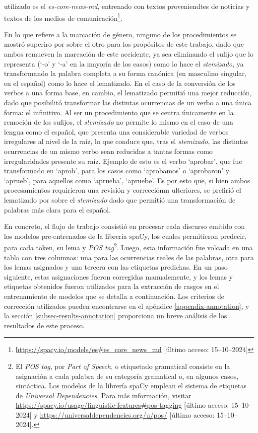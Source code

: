 utilizado es el \textit{es-core-news-md}, entrenado con textos
proveniendtes de noticias y textos de los medios de
comunicación\footnote{\url{https://spacy.io/models/es\#es_core_news_md}
[último acceso: 15--10--2024]}.
\par
En lo que refiere a la marcación de género, ninguno de los procedimientos se mostró
superiro por sobre el otro para los propósitos de este trabajo, dado que ambos
remueven la marcación de este accidente, ya sea eliminando el sufijo que lo
representa (`-o' y `-a' en la mayoría de los casos) como lo hace el
\textit{stemizado}, ya transformando la palabra completa a su forma canónica
(en masculino singular, en el español) como lo hace el lematizado. En el caso
de la conversión de los verbos a una forma base, en cambio, el lematizado permitió
una mejor reducción, dado que posibilitó transformar las distintas ocurrencias
de un verbo a una única forma: el infinitivo. Al ser un procedimiento que se
centra únicamente en la remoción de los sufijos, el \textit{stemizado} no permite
lo mismo en el caso de una lengua como el español, que presenta una considerable
variedad de verbos irregulares al nivel de la raíz, lo que conduce que, tras el
\textit{stemizado}, las distintas ocurrencias de un mismo verbo sean reducidas
a tantas formas como irregularidades presente su raíz. Ejemplo de esto es el
verbo `aprobar', que fue transformado en `aprob', para los casos como
`aprobamos' o `aprobaron' y `aprueb', para aquellos como `aprueba',
`apruebe'. Es por esto que, si bien ambos procesamientos requirieron una revisión
y correcciómn ulteriores, se prefirió el lematizado por sobre el \textit{stemizado}
dado que permitió una transformación de palabras más clara para el español.
\par
En concreto, el flujo de trabajo consistió en procesar cada discurso emitido
con los modelos pre-entrenados de la librería spaCy, los cuales permitieron
predecir, para cada token, su lema y \textit{POS tag}\footnote{El
\textit{POS tag}, por \textit{Part of Speech}, o etiquetado gramatical consiste
en la asignación a cada palabra de su categoría gramatical o, en algunos casos,
sintáctica. Los modelos de la
librería spaCy emplean el sistema de etiquetas de \textit{Universal Dependencies}.
Para más información, visitar
\url{https://spacy.io/usage/linguistic-features\#pos-tagging}
[último acceso: 15--10--2024]
y \url{https://universaldependencies.org/u/pos/}
[último acceso: 15--10--2024].}. Luego, esta
información fue volcada en una tabla con tres columnas: una para las ocurrencias
reales de las palabras, otra para los lemas asignados y una tercera con las etiquetas predichas. En un paso siguiente, estas asignaciones fueron corregidas
manualemente, y los lemas y etiquetas obtenidos fueron utilizados para la
extracción de rasgos en el entrenamiento de modelos que se detalla a continuación.
Los criterios de corrección utilizados pueden encontrarse en el apéndice
\ref{appendix-annotation}, y la sección \ref{subsec-results-annotation}
proporciona un breve análisis de los resultados de este proceso.
